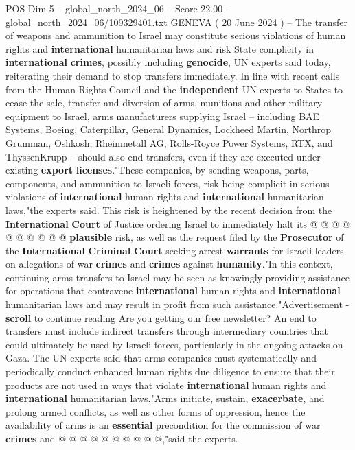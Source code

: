 \begin{textsample}{POS Dim 5 – global\_north\_2024\_06 – Score 22.00 – global\_north\_2024\_06/109329401.txt}  \label{ex:f5_pos_312}
GENEVA ( 20 June 2024 ) -- The transfer of weapons and ammunition to Israel may constitute serious violations of human rights and \textbf{international} humanitarian laws and risk State complicity in \textbf{international} \textbf{crimes}, possibly including \textbf{genocide}, UN experts said today, reiterating their demand to stop transfers immediately.
In line with recent calls from the Human Rights Council and the \textbf{independent} UN experts to States to cease the sale, transfer and diversion of arms, munitions and other military equipment to Israel, arms manufacturers supplying Israel -- including BAE Systems, Boeing, Caterpillar, General Dynamics, Lockheed Martin, Northrop Grumman, Oshkosh, Rheinmetall AG, Rolls-Royce Power Systems, RTX, and ThyssenKrupp -- should also end transfers, even if they are executed under existing \textbf{export} \textbf{licenses}."These companies, by sending weapons, parts, components, and ammunition to Israeli forces, risk being complicit in serious violations of \textbf{international} human rights and \textbf{international} humanitarian laws,"the experts said.
This risk is heightened by the recent decision from the \textbf{International} \textbf{Court} of Justice ordering Israel to immediately halt its @ @ @ @ @ @ @ @ @ @ \textbf{plausible} risk, as well as the request filed by the \textbf{Prosecutor} of the \textbf{International} \textbf{Criminal} \textbf{Court} seeking arrest \textbf{warrants} for Israeli leaders on allegations of war \textbf{crimes} and \textbf{crimes} against \textbf{humanity}."In this context, continuing arms transfers to Israel may be seen as knowingly providing assistance for operations that contravene \textbf{international} human rights and \textbf{international} humanitarian laws and may result in profit from such assistance."Advertisement - \textbf{scroll} to continue reading Are you getting our free newsletter?
An end to transfers must include indirect transfers through intermediary countries that could ultimately be used by Israeli forces, particularly in the ongoing attacks on Gaza.
The UN experts said that arms companies must systematically and periodically conduct enhanced human rights due diligence to ensure that their products are not used in ways that violate \textbf{international} human rights and \textbf{international} humanitarian laws."Arms initiate, sustain, \textbf{exacerbate}, and prolong armed conflicts, as well as other forms of oppression, hence the availability of arms is an \textbf{essential} precondition for the commission of war \textbf{crimes} and @ @ @ @ @ @ @ @ @ @,"said the experts.

\end{textsample}
